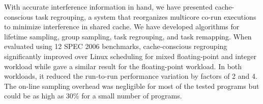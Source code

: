 \documentclass[12pt]{report}
\begin{document}
With accurate interference information in hand, we have presented
cache-conscious task regrouping, a system that 
reorganizes multicore co-run executions to minimize interference in
shared cache.  We have developed algorithms for lifetime sampling,
group sampling, task regrouping, and task remapping.  When evaluated
using 12 SPEC 2006 benchmarks, cache-conscious regrouping
significantly improved over Linux scheduling for mixed floating-point
and integer workload while gave a similar result for the
floating-point workload.  In both workloads, it reduced the run-to-run
performance variation by factors of 2 and 4.  The on-line sampling 
overhead was negligible for most of the tested programs but could be
as high as 30\% for a small number of programs.  



%


%
\end{document}
